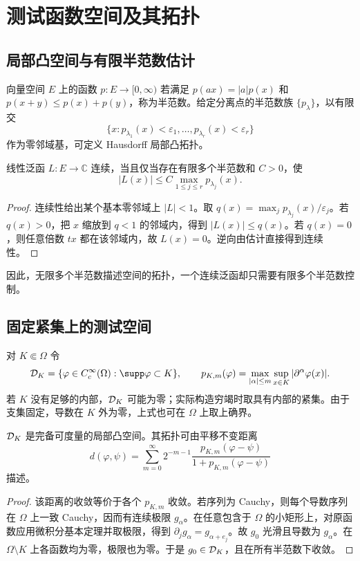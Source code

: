 \chapter{测试函数空间及其拓扑}\label{ch:test}

\section{局部凸空间与有限半范数估计}
\begin{definition}[半范数]
向量空间 $E$ 上的函数 $p:E\to[0,\infty)$ 若满足 $p(ax)=|a|p(x)$ 和 $p(x+y)\le p(x)+p(y)$，称为半范数。给定分离点的半范数族 $\{p_\lambda\}$，以有限交
\[
 \{x:p_{\lambda_1}(x)<\varepsilon_1,\ldots,p_{\lambda_r}(x)<\varepsilon_r\}
\]
作为零邻域基，可定义 Hausdorff 局部凸拓扑。
\end{definition}
\begin{proposition}[连续线性泛函的估计]\label{prop:seminorm-est}
线性泛函 $L:E\to\mathbb C$ 连续，当且仅当存在有限多个半范数和 $C>0$，使
\[
 |L(x)|\le C\max_{1\le j\le r}p_{\lambda_j}(x).
\]
\end{proposition}
\begin{proof}
连续性给出某个基本零邻域上 $|L|<1$。取 $q(x)=\max_jp_{\lambda_j}(x)/\varepsilon_j$。若 $q(x)>0$，把 $x$ 缩放到 $q<1$ 的邻域内，得到 $|L(x)|\le q(x)$。若 $q(x)=0$，则任意倍数 $tx$ 都在该邻域内，故 $L(x)=0$。逆向由估计直接得到连续性。
\end{proof}
因此，无限多个半范数描述空间的拓扑，一个连续泛函却只需要有限多个半范数控制。

\section{固定紧集上的测试空间}
对 $K\Subset\Omega$ 令
\[
 \Test_K=\{\varphi\in C_c^\infty(\Omega):\supp\varphi\subset K\},\qquad
 p_{K,m}(\varphi)=\max_{|\alpha|\le m}\sup_{x\in K}|\partial^\alpha\varphi(x)|.
\]
若 $K$ 没有足够的内部，$\mathcal{D}_K$ 可能为零；实际构造穷竭时取具有内部的紧集。由于支集固定，导数在 $K$ 外为零，上式也可在 $\Omega$ 上取上确界。
\begin{proposition}[Fréchet 性]
$\mathcal{D}_K$ 是完备可度量的局部凸空间。其拓扑可由平移不变距离
\[
 d(\varphi,\psi)=\sum_{m=0}^\infty2^{-m-1}
 \frac{p_{K,m}(\varphi-\psi)}{1+p_{K,m}(\varphi-\psi)}
\]
描述。
\end{proposition}
\begin{proof}
该距离的收敛等价于各个 $p_{K,m}$ 收敛。若序列为 Cauchy，则每个导数序列在 $\Omega$ 上一致 Cauchy，因而有连续极限 $g_\alpha$。在任意包含于 $\Omega$ 的小矩形上，对原函数应用微积分基本定理并取极限，得到 $\partial_jg_\alpha=g_{\alpha+e_j}$。故 $g_0$ 光滑且导数为 $g_\alpha$。在 $\Omega\setminus K$ 上各函数均为零，极限也为零。于是 $g_0\in\mathcal{D}_K$，且在所有半范数下收敛。
\end{proof}

